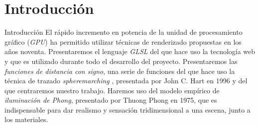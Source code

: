 \section{Introducción}

\begin{frame}{Introducción}
    El rápido incremento en potencia de la unidad de procesamiento gráfico (\textit{GPU}) ha permitido utilizar técnicas de renderizado propuestas en los años noventa. Presentaremos el lenguaje \textit{GLSL} del que hace uso la tecnología web y que es utilizado durante todo el desarrollo del proyecto.\vfill
    Presentaremos las \textit{funciones de distancia con signo}, una serie de funciones del que hace uso la técnica de trazado \textit{spheremarching} \cite{hart1996sphere}, presentada por John C. Hart en 1996 y del que centraremos nuestro trabajo.\vfill
    Haremos uso del modelo empírico de \textit{iluminación de Phong}, presentado por Thuong Phong en 1975, que es indispensable para dar realismo y sensación tridimensional a una escena, junto a los materiales.
\end{frame}